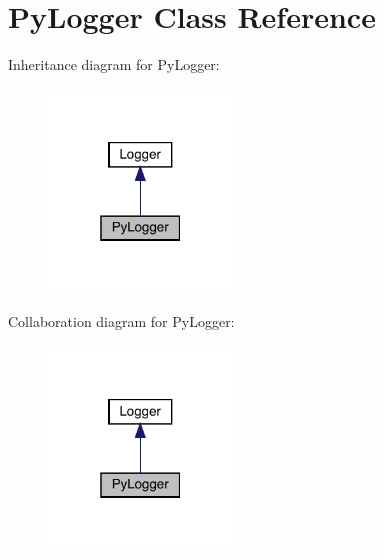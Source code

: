 \hypertarget{class_py_logger}{}\section{Py\+Logger Class Reference}
\label{class_py_logger}


Inheritance diagram for Py\+Logger\+:\nopagebreak
\begin{figure}[H]
\begin{center}
\leavevmode
\includegraphics[width=139pt]{class_py_logger__inherit__graph}
\end{center}
\end{figure}


Collaboration diagram for Py\+Logger\+:\nopagebreak
\begin{figure}[H]
\begin{center}
\leavevmode
\includegraphics[width=139pt]{class_py_logger__coll__graph}
\end{center}
\end{figure}
